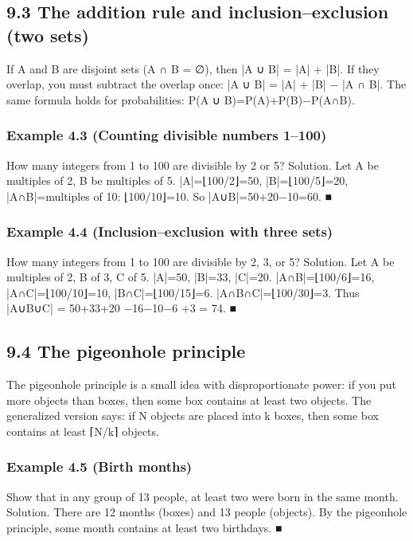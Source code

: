 \documentclass[11pt]{article}
\begin{document}
\subsection{9.3 The addition rule and inclusion–exclusion (two sets)}
If A and B are disjoint sets (A ∩ B = ∅), then |A ∪ B| = |A| + |B|. If they overlap, you must
subtract the overlap once: |A ∪ B| = |A| + |B| − |A ∩ B|. The same formula holds for
probabilities: P(A ∪ B)=P(A)+P(B)−P(A∩B).
\subsubsection*{Example 4.3 (Counting divisible numbers 1–100)}
How many integers from 1 to 100 are divisible by 2 or 5?
Solution. Let A be multiples of 2, B be multiples of 5.
|A|=⌊100/2⌋=50, |B|=⌊100/5⌋=20, |A∩B|=multiples of 10: ⌊100/10⌋=10.
So |A∪B|=50+20−10=60. ■
\subsubsection*{Example 4.4 (Inclusion–exclusion with three sets)}
How many integers from 1 to 100 are divisible by 2, 3, or 5?
Solution. Let A be multiples of 2, B of 3, C of 5.
|A|=50, |B|=33, |C|=20.
|A∩B|=⌊100/6⌋=16, |A∩C|=⌊100/10⌋=10, |B∩C|=⌊100/15⌋=6.
|A∩B∩C|=⌊100/30⌋=3.
Thus |A∪B∪C| = 50+33+20 −16−10−6 +3 = 74. ■
\subsection{9.4 The pigeonhole principle}
The pigeonhole principle is a small idea with disproportionate power: if you put more
objects than boxes, then some box contains at least two objects. The generalized version
says: if N objects are placed into k boxes, then some box contains at least ⌈N/k⌉ objects.
\subsubsection*{Example 4.5 (Birth months)}
Show that in any group of 13 people, at least two were born in the same month.
Solution. There are 12 months (boxes) and 13 people (objects). By the pigeonhole
principle, some month contains at least two birthdays. ■
\end{document}
